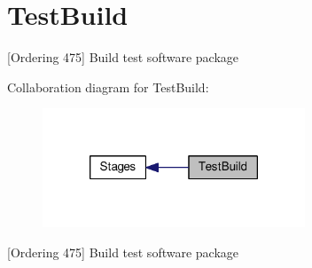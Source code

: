 \hypertarget{group___test_build}{\section{Test\-Build}
\label{group___test_build}
}


\mbox{[}Ordering 475\mbox{]} Build test software package  


Collaboration diagram for Test\-Build\-:
\nopagebreak
\begin{figure}[H]
\begin{center}
\leavevmode
\includegraphics[width=222pt]{group___test_build}
\end{center}
\end{figure}
\mbox{[}Ordering 475\mbox{]} Build test software package 